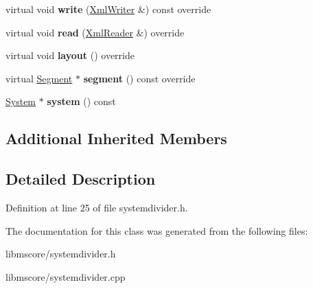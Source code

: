 \begin{DoxyCompactItemize}
virtual void {\bfseries write} (\hyperlink{class_ms_1_1_xml_writer}{Xml\+Writer} \&) const override
\item 
\mbox{\label{class_ms_1_1_system_divider_aa73e68e80e4ed86e145ef25c823a99c6}} 
virtual void {\bfseries read} (\hyperlink{class_ms_1_1_xml_reader}{Xml\+Reader} \&) override
\item 
\mbox{\label{class_ms_1_1_system_divider_a00847d5bb01faa5657fca4d4d87dedf8}} 
virtual void {\bfseries layout} () override
\item 
\mbox{\label{class_ms_1_1_system_divider_a92592ac954f463ab5a931390c57cf474}} 
virtual \hyperlink{class_ms_1_1_segment}{Segment} $\ast$ {\bfseries segment} () const override
\item 
\mbox{\label{class_ms_1_1_system_divider_ab02657a28f8b21d716e60dc8649d680e}} 
\hyperlink{class_ms_1_1_system}{System} $\ast$ {\bfseries system} () const
\end{DoxyCompactItemize}
\subsection*{Additional Inherited Members}


\subsection{Detailed Description}


Definition at line 25 of file systemdivider.\+h.



The documentation for this class was generated from the following files\+:\begin{DoxyCompactItemize}
\item 
libmscore/systemdivider.\+h\item 
libmscore/systemdivider.\+cpp\end{DoxyCompactItemize}
